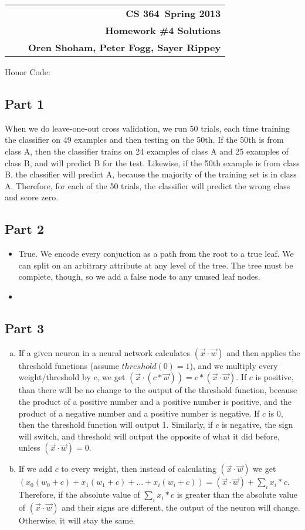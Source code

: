 \documentclass[11pt]{article}
\makeatletter
\newcommand{\course}{CS 364}
\newcommand{\semester}{Spring 2013}
\newcommand{\hwk}{Homework \#4 Solutions}
\newcommand{\student}{Oren Shoham, Peter Fogg, Sayer Rippey}
\renewcommand\maketitle{
\begin{center}
\begin{tabular*}{6.44in}{l @{\extracolsep{\fill}}c r}
\bfseries  &  & \bfseries \course ~\semester \\
\bfseries&  & \bfseries  \hwk  \\
\bfseries   &   &  \bfseries \student \\ 
\end{tabular*}
\end{center} }
\makeatother
\begin{document}
\maketitle
\thispagestyle{plain}


\noindent Honor Code: 

\subsection*{Part 1}
When we do leave-one-out cross validation, we run 50 trials, each time training the classifier on 49  examples and then testing on the 50th. If the 50th is from class A, then the classifier trains on 24 examples of class A and 25 examples of class B, and will predict B for the test. Likewise, if the 50th example is from class B, the classifier will predict A, because the majority of the training set is in class A. Therefore, for each of the 50 trials, the classifier will predict the wrong class and score zero.
\subsection*{Part 2}
\begin{itemize}
\item True. We encode every conjuction as a path from the root to a true leaf. We can split on an arbitrary attribute at any level of the tree. The tree must be complete, though, so we add a false node to any unused leaf nodes.
\item
\end{itemize}
\subsection*{Part 3}
\begin{enumerate}[a.]
\item If a given neuron in a neural network calculates $(\vec{x} \cdot \vec{w})$ and then applies the threshold functions (assume $threshold(0) =  1$), and we multiply every weight/threshold by $c$, we get  $(\vec{x} \cdot (c * \vec{w})) =  c*(\vec{x} \cdot \vec{w})$. If $c$ is positive, than there will be no change to the output of the threshold function, because the product of a positive number and a positive number is positive, and the product of a negative number and a positive number is negative. If $c$ is 0, then the threshold function will output 1. Similarly, if $c$ is negative, the sign will switch, and threshold will output the opposite of what it did before, unless $(\vec{x} \cdot \vec{w}) = 0$.
\item If we add $c$ to every weight, then instead of calculating $(\vec{x} \cdot \vec{w})$ we get $(x_{0}(w_{0} + c) + x_{1}(w_{1} + c) + \ldots + x_{i}(w_{i} + c)) = (\vec{x} \cdot \vec{w}) + \sum\limits_{i} x_{i}*c$. Therefore, if the absolute value of $\sum\limits_{i} x_{i}*c$ is greater than the absolute value of $(\vec{x} \cdot \vec{w}) $ and their signs are different, the output of the neuron will change. Otherwise, it will stay the same. 
\end{enumerate}
\end{document}
